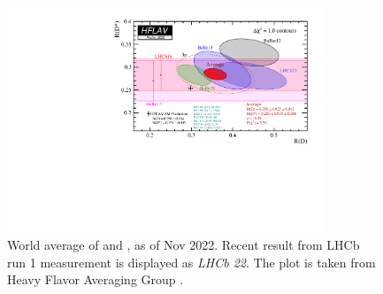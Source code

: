 \begin{figure}[!htb]
    \centering
    \includegraphics[width=0.85\textwidth]{./figs-intro/hflav_2022_preliminary.pdf}
    \caption{
        World average of \RD and \RDst, as of Nov 2022.
        Recent result from LHCb run 1 measurement is displayed as
        \emph{LHCb 22}.
        The plot is taken from Heavy Flavor Averaging Group
        \cite{Amhis:2022mac}.
    }
    \label{fig:hflav}
\end{figure}

